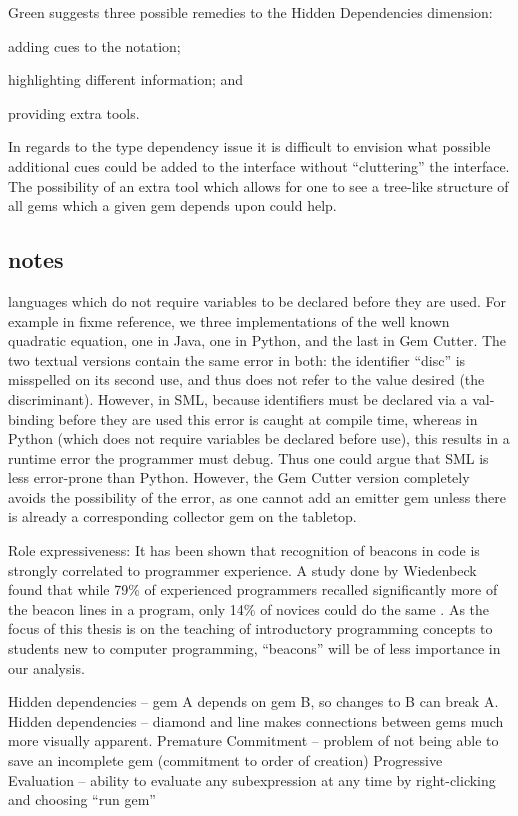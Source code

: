 Green suggests three possible remedies to the Hidden Dependencies dimension: 
\begin{inparaenum}[(a)]
	\item adding cues to the notation;
	\item highlighting different information; and 
	\item providing extra tools.
\end{inparaenum}

In regards to the type dependency issue it is difficult to envision what possible additional cues could be added to the interface without ``cluttering'' the interface.  The possibility of an extra tool which allows for one to see a tree-like structure of all gems which a given gem depends upon could help.


\subsection{notes}

languages which do not require variables to be declared before they are used.  For example in fixme reference, we three implementations of the well known quadratic equation, one in Java, one in Python, and the last in Gem Cutter.  The two textual versions contain the same error in both: the identifier ``disc'' is misspelled on its second use, and thus does not refer to the value desired (the discriminant).  However, in SML, because identifiers must be declared via a val-binding before they are used this error is caught at compile time, whereas in Python (which does not require variables be declared before use), this results in a runtime error the programmer must debug.  Thus one could argue that SML is less error-prone than Python.  However, the Gem Cutter version completely avoids the possibility of the error, as one cannot add an emitter gem unless there is already a corresponding collector gem on the tabletop.


Role expressiveness:
It has been shown that recognition of beacons in code is strongly correlated to programmer experience.  A study done by Wiedenbeck found that while 79\% of experienced programmers recalled significantly more of the beacon lines in a program, only 14\% of novices could do the same \cite{Wiedenbeck91}.  As the focus of this thesis is on the teaching of introductory programming concepts to students new to computer programming, ``beacons'' will be of less importance in our analysis.


Hidden dependencies -- gem A depends on gem B, so changes to B can break A.
Hidden dependencies -- diamond and line makes connections between gems much more visually apparent.
Premature Commitment -- problem of not being able to save an incomplete gem (commitment to order of creation)
Progressive Evaluation -- ability to evaluate any subexpression at any time by right-clicking and choosing ``run gem''


